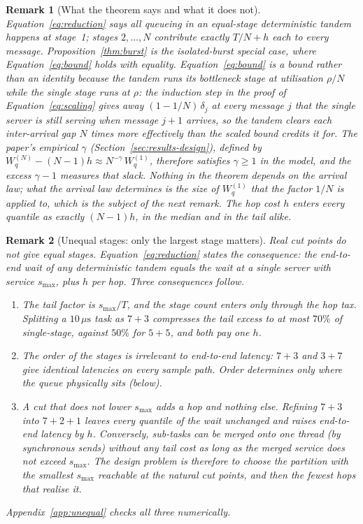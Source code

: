 \documentclass[11pt]{article}
\newtheorem{remark}{Remark}[section]
\begin{document}
\begin{remark}[What the theorem says and what it does not]
Equation~\eqref{eq:reduction} says all queueing in an equal-stage deterministic tandem
happens at stage~1; stages $2, \ldots, N$ contribute exactly $T/N + h$ each to every
message. Proposition~\ref{thm:burst} is the isolated-burst special case, where
Equation~\eqref{eq:bound} holds with equality. Equation~\eqref{eq:bound} is a bound rather
than an identity because the tandem runs its bottleneck stage at utilisation $\rho/N$
while the single stage runs at $\rho$: the induction step in the proof of
Equation~\eqref{eq:scaling} gives away $(1 - 1/N)\,\delta_j$ at every message $j$ that the
single server is still serving when message $j+1$ arrives, so the tandem clears each
inter-arrival gap $N$ times more effectively than the scaled bound credits it for. The
paper's empirical $\gamma$ (Section~\ref{sec:results-design}), defined by $W_q^{(N)} -
(N-1)h \approx N^{-\gamma}\, W_q^{(1)}$, therefore satisfies $\gamma \ge 1$ in the model,
and the excess $\gamma - 1$ measures that slack. Nothing in the theorem depends on the
arrival law; what the arrival law determines is the size of $W_q^{(1)}$ that the factor
$1/N$ is applied to, which is the subject of the next remark. The hop cost $h$ enters
every quantile as exactly $(N-1)h$, in the median and in the tail alike.
\end{remark}

\begin{remark}[Unequal stages: only the largest stage matters]
\label{rem:unequal}
Real cut points do not give equal stages. Equation~\eqref{eq:reduction} states the
consequence: the end-to-end wait of any deterministic tandem equals the wait at a single
server with service $s_{\max}$, plus $h$ per hop. Three consequences follow.
\begin{enumerate}
    \item The tail factor is $s_{\max}/T$, and the stage count enters only through the hop
tax. Splitting a $10\,\mu\mathrm{s}$ task as $7 + 3$ compresses the tail excess to at most
$70\%$ of single-stage, against $50\%$ for $5 + 5$, and both pay one $h$.
    \item The order of the stages is irrelevant to end-to-end latency: $7 + 3$ and $3 + 7$
give identical latencies on every sample path. Order determines only where the queue
physically sits (below).
    \item A cut that does not lower $s_{\max}$ adds a hop and nothing else. Refining
$7 + 3$ into $7 + 2 + 1$ leaves every quantile of the wait unchanged and raises
end-to-end latency by $h$. Conversely, sub-tasks can be merged onto one thread (by
synchronous sends) without any tail cost as long as the merged service does not exceed
$s_{\max}$. The design problem is therefore to choose the partition with the smallest
$s_{\max}$ reachable at the natural cut points, and then the fewest hops that realise it.
\end{enumerate}
Appendix~\ref{app:unequal} checks all three numerically.
\end{remark}
\end{document}
